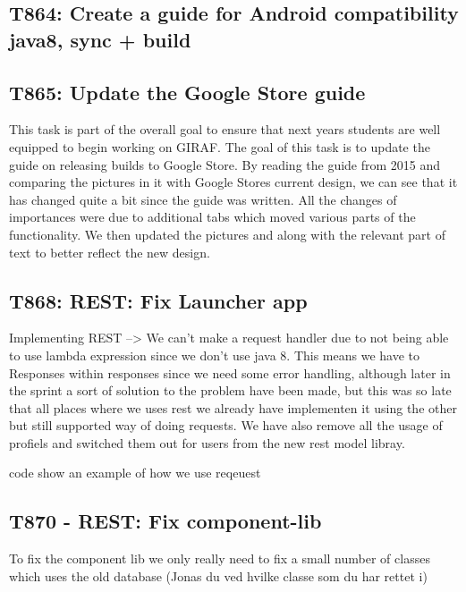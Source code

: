 \subsection{T864: Create a guide for Android compatibility java8, sync + build}

\subsection{T865: Update the Google Store guide}

This task is part of the overall goal to ensure that next years students are
well equipped to begin working on GIRAF. The goal of this task is to update the
guide on releasing builds to Google Store. By reading the guide from 2015 and
comparing the pictures in it with Google Stores current design, we can see that
it has changed quite a bit since the guide was written. All the changes of
importances were due to additional tabs which moved various parts of the
functionality. We then updated the pictures and along with the relevant part of
text to better reflect the new design.


\subsection{T868: REST: Fix Launcher app}
Implementing REST --> We can't make a request handler due to not being able
to use lambda expression since we don't use java 8.
This means we have to Responses within responses since we need some error
handling, although later in the sprint a sort of solution to the problem have
been made, but this was so late that all places where we uses rest we already
have implementen it using the other but still supported way of doing requests.
We have also remove all the usage of profiels and switched them out for users
from the new rest model libray.

code show an example of how we use reqeuest

\subsection{T870 - REST: Fix component-lib}
To fix the component lib we only really need to fix a small number of classes
which uses the old database (Jonas du ved hvilke classe som du har rettet i)

